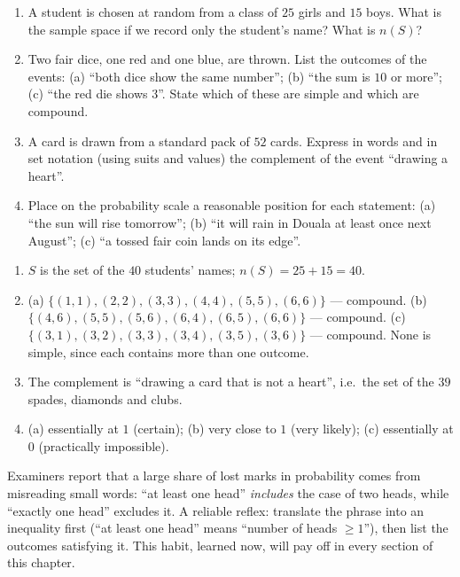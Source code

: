 \documentclass[11pt]{article}
\begin{document}
\begin{exercice}
\begin{enumerate}
\item A student is chosen at random from a class of $25$ girls and $15$ boys. What is the sample space if we record only the student's name? What is $n(S)$?
\item Two fair dice, one red and one blue, are thrown. List the outcomes of the events: (a) ``both dice show the same number''; (b) ``the sum is $10$ or more''; (c) ``the red die shows $3$''. State which of these are simple and which are compound.
\item A card is drawn from a standard pack of $52$ cards. Express in words and in set notation (using suits and values) the complement of the event ``drawing a heart''.
\item Place on the probability scale a reasonable position for each statement: (a) ``the sun will rise tomorrow''; (b) ``it will rain in Douala at least once next August''; (c) ``a tossed fair coin lands on its edge''.
\end{enumerate}
\end{exercice}

\begin{corrige}[Exercise 1]
\begin{enumerate}
\item $S$ is the set of the $40$ students' names; $n(S) = 25 + 15 = 40$.
\item (a) $\{(1,1),(2,2),(3,3),(4,4),(5,5),(6,6)\}$ --- compound. (b) $\{(4,6),(5,5),(5,6),(6,4),(6,5),(6,6)\}$ --- compound. (c) $\{(3,1),(3,2),(3,3),(3,4),(3,5),(3,6)\}$ --- compound. None is simple, since each contains more than one outcome.
\item The complement is ``drawing a card that is not a heart'', i.e.\ the set of the $39$ spades, diamonds and clubs.
\item (a) essentially at $1$ (certain); (b) very close to $1$ (very likely); (c) essentially at $0$ (practically impossible).
\end{enumerate}
\end{corrige}

\begin{savaistu}
Examiners report that a large share of lost marks in probability comes from misreading small words: ``at least one head'' \emph{includes} the case of two heads, while ``exactly one head'' excludes it. A reliable reflex: translate the phrase into an inequality first (``at least one head'' means ``number of heads $\ge 1$''), then list the outcomes satisfying it. This habit, learned now, will pay off in every section of this chapter.
\end{savaistu}
\end{document}
